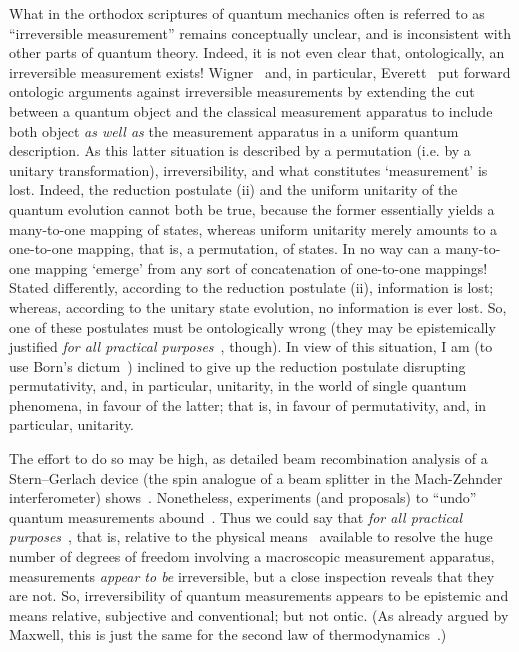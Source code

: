 What in the orthodox scriptures of quantum mechanics often is referred to as ``irreversible measurement'' remains conceptually unclear,
and is inconsistent with other parts of quantum theory.
Indeed, it is not even clear that, ontologically, an irreversible measurement exists!
Wigner~\cite{wigner:mb} and, in particular, Everett~\cite{everett,everett-collw} put forward ontologic arguments against irreversible measurements
by extending the cut between a quantum object and the classical measurement apparatus to include both object
{\em as well as} the measurement apparatus in a uniform quantum description.
As this latter situation is described by a permutation (i.e. by a unitary transformation),
irreversibility, and what constitutes `measurement' is lost.
Indeed, the reduction postulate (ii) and the uniform unitarity of the quantum evolution cannot both be true, because the former
essentially yields a many-to-one mapping of states, whereas uniform unitarity merely amounts to a one-to-one mapping, that is, a permutation, of states.
In no way can a many-to-one mapping `emerge' from any sort of concatenation of one-to-one mappings!
Stated differently, according to the reduction postulate (ii), information is lost;
whereas, according to the unitary state evolution, no information is ever lost.
So, one of these postulates must be ontologically wrong (they may be epistemically justified {\em for all practical purposes}~\cite{bell:a1}, though).
In view of this situation, I am (to use Born's dictum~\cite[p.~866]{born-26-1})
inclined to give up the reduction postulate disrupting permutativity, and, in particular,
unitarity, in the world of single quantum phenomena, in favour of the latter; that is, in favour of  permutativity, and, in particular,
unitarity.



The effort to do so may be high, as detailed beam recombination analysis of  a Stern--Gerlach device (the spin analogue of a beam splitter in the Mach-Zehnder interferometer)
shows~\cite{engrt-sg-I,engrt-sg-II}.
Nonetheless, experiments (and proposals) to ``undo'' quantum measurements
abound~\cite{PhysRevD.22.879,PhysRevA.25.2208,greenberger2,Nature351,Zajonc-91,PhysRevA.45.7729,PhysRevLett.73.1223,PhysRevLett.75.3783,hkwz}.
Thus we could say that {\em for all practical purposes}~\cite{bell-a},
that is, {relative to the physical means}~\cite{Myrvold2011237} available to resolve the huge number of degrees of freedom involving a
macroscopic measurement apparatus, measurements {\em appear to be} irreversible, but a close inspection reveals that they are not.
So, irreversibility of quantum measurements appears to be epistemic and means relative, subjective and conventional; but not ontic.
(As already argued by Maxwell, this is just the same for the second law of thermodynamics~\cite{Myrvold2011237}.)




